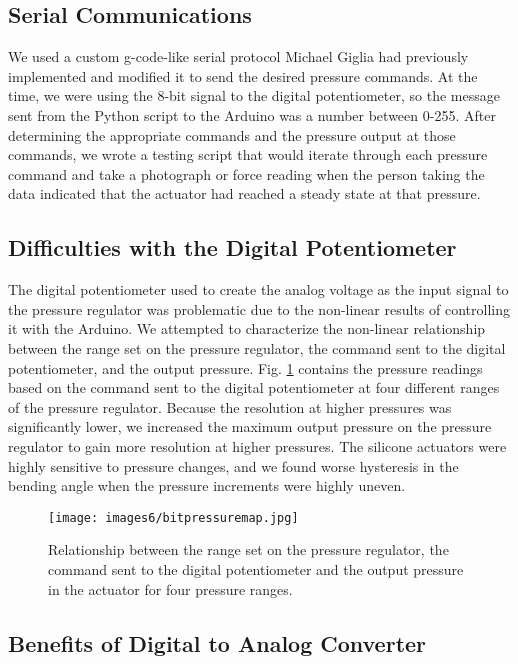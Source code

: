 \subsection{Serial Communications}

We used a custom g-code-like serial protocol Michael Giglia had previously implemented and modified it to send the desired pressure commands. At the time, we were using the 8-bit signal to the digital potentiometer, so the message sent from the Python script to the Arduino was a number between 0-255. After determining the appropriate commands and the pressure output at those commands, we wrote a testing script that would iterate through each pressure command and take a photograph or force reading when the person taking the data indicated that the actuator had reached a steady state at that pressure.

\subsection{Difficulties with the Digital Potentiometer}

The digital potentiometer used to create the analog voltage as the input signal to the pressure regulator was problematic due to the non-linear results of controlling it with the Arduino. We attempted to characterize the non-linear relationship between the range set on the pressure regulator, the command sent to the digital potentiometer, and the output pressure. Fig. \ref{fig:bitpressuremap} contains the pressure readings based on the command sent to the digital potentiometer at four different ranges of the pressure regulator. Because the resolution at higher pressures was significantly lower, we increased the maximum output pressure on the pressure regulator to gain more resolution at higher pressures. The silicone actuators were highly sensitive to pressure changes, and we found worse hysteresis in the bending angle when the pressure increments were highly uneven. 

\begin{figure}[ht]
    \centering
    \texttt{[image: images6/bitpressuremap.jpg]}
    \caption{Relationship between the range set on the pressure regulator, the command sent to the digital potentiometer and the output pressure in the actuator for four pressure ranges.}
    \label{fig:bitpressuremap}
\end{figure}


\subsection{Benefits of Digital to Analog Converter}

